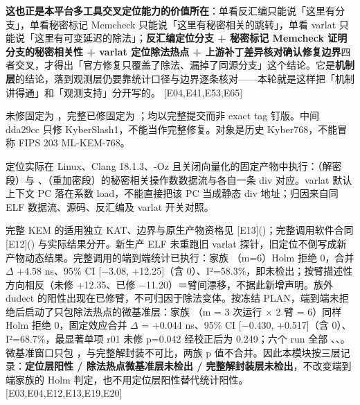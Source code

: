 \documentclass[UTF8,fontset=fandol,11pt,a4paper]{ctexart}
\begin{document}
\textbf{这也正是本平台多工具交叉定位能力的价值所在}：单看反汇编只能说「这里有分支」，单看秘密标记 Memcheck 只能说「这里有秘密相关的跳转」，单看 varlat 只能说「这里有可变延迟的除法」；\textbf{反汇编定位分支 + 秘密标记 Memcheck 证明分支的秘密相关性 + varlat 定位除法热点 + 上游补丁差异核对确认修复边界}四者交叉，才得出「官方修复只覆盖了除法、漏掉了同源分支」这个结论。它是\textbf{机制层}的结论，落到观测层仍要靠统计口径与边界逐条核对——本轮就是这样把「机制讲得通」和「观测支持」分开写的。 [E04,E41,E53,E65]


未修固定为 \texttt{}，完整已修固定为 \texttt{}；均以完整提交而非 exact tag 钉版。中间 dda29cc 只修 KyberSlash1，不能当作完整修复。对象是历史 Kyber768，不能冒称 FIPS 203 ML-KEM-768。


定位实际在 \texttt{} Linux、Clang 18.1.3、-Oz 且关闭向量化的固定产物中执行：\texttt{}（解密段）与 \texttt{}、\texttt{}（重加密段）的秘密相关操作数数据流与各自一条 div 对应。varlat 默认上下文 PC 落在系数 load，不能直接把该 PC 当成静态 div 地址；归因来自同 ELF 数据流、源码、反汇编及 varlat 开关对照。


完整 KEM 的适用独立 KAT、边界与原生产物资格见 [E13](\texttt{})；完整调用软件合同 [E12](\texttt{}) 与实际结果分开。新生产 ELF 未重跑旧 varlat 探针，旧定位不倒写成新产物动态结果。完整调用的端到端统计已执行：家族 \texttt{}（m=6）Holm 拒绝 0，合并 \texorpdfstring{$\Delta$}{Delta} +4.58 ns、95\% CI [\texorpdfstring{$-$}{-}3.08, +12.25]（含 0）、I²=58.3\%，即未检出；按臂描述性方向相反（未修 +12.35、已修 \texorpdfstring{$-$}{-}11.20）＝臂间漂移，不据此新增声明。族外 dudect 的阳性出现在已修臂，不可归因于除法变体。按冻结 PLAN，端到端未拒绝后启动了只包除法热点的微基准层：家族 \texttt{}（m = 3 次运行 \texorpdfstring{$\times$}{x} 2 臂 = 6）同样 Holm 拒绝 0，固定效应合并 \texorpdfstring{$\Delta$}{Delta} = +0.044 ns、95\% CI [\texorpdfstring{$-$}{-}0.430, +0.517]（含 0）、I²=68.7\%，最显著单项 r01 未修 p=0.042 经校正后为 0.249；六个 run 全部 \texttt{}、\texttt{}、\texttt{}。微基准窗口只包 \texttt{}，与完整解封装不可比，两族 p 值不合并。因此本模块按三层记录：\textbf{定位层阳性 / 除法热点微基准层未检出 / 完整解封装层未检出}，不改变端到端家族的 Holm 判定，也不用定位层阳性替代统计阳性。 [E03,E04,E12,E13,E19,E20]
\end{document}
